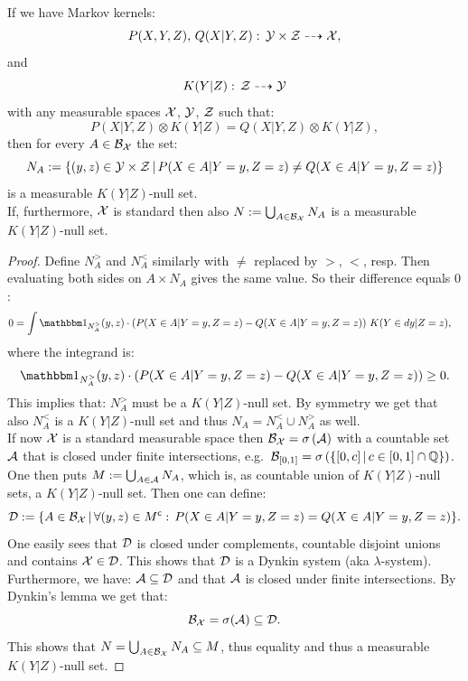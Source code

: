 \begin{Lem}
    \label{ess-unique}
    If we have Markov kernels:    
    \[P(X,Y,Z),\,Q(X|Y,Z):\, \mathcal{Y}\times \mathcal{Z} \dashrightarrow \mathcal{X},\]
    and 
    \[K(Y|Z):\,\mathcal{Z} \dashrightarrow \mathcal{Y}\]
    with any measurable spaces $\mathcal{X}$, $\mathcal{Y}$, $\mathcal{Z}$ such that:
    \[ P(X|Y,Z) \otimes K(Y|Z) = Q(X|Y,Z) \otimes K(Y|Z), \]
    then for every $A \in \mathcal{B}_{\mathcal{X}}$ the set:
    \[N_A := \left \{ (y,z) \in \mathcal{Y} \times \mathcal{Z} \,|\, P(X \in A|Y=y,Z=z) \neq Q(X \in A|Y=y,Z=z)\right \}\]
     is a measurable $K(Y|Z)$-null set. \\
     If, furthermore, $\mathcal{X}$ is standard then also $N := \bigcup_{A \in \mathcal{B}_{\mathcal{X}}} N_A$ is a measurable $K(Y|Z)$-null set.
     \begin{proof}
         Define $N_A^>$ and $N_A^<$ similarly with $\neq$ replaced by $>$, $<$, resp.
         Then evaluating both sides on $A \times N_A$ gives the same value. So their difference equals $0$:
         \begin{align*}
             0& =  \int \I_{N_A^>}(y,z)\cdot \lp P(X\in A|Y=y,Z=z) - Q(X \in A|Y=y,Z=z) \rp \, K(Y \in dy|Z=z), 
         \end{align*}
         where the integrand is:
         \[\I_{N_A^>}(y,z)\cdot \lp P(X\in A|Y=y,Z=z) - Q(X \in A|Y=y,Z=z) \rp  \ge 0.\]
         This implies that: $N_A^>$ must be a $K(Y|Z)$-null set.
         By symmetry we get that also $N_A^<$ is a $K(Y|Z)$-null set and thus $N_A = N_A^< \cup N_A^>$ as well.\\
         If now $\mathcal{X}$ is a standard measurable space then $\mathcal{B}_{\mathcal{X}} =\sigma\left ( \mathcal{A}\right )$ 
         with a countable set $\mathcal{A}$ that is closed under finite intersections, e.g.\ 
         $\mathcal{B}_{[0,1]}=\sigma\left (\left \{[0,c]\,|\, c \in [0,1] \cap \mathbb{Q}\right \}\right )$. 
         One then puts $M:=\bigcup_{A \in \mathcal{A}} N_A$, which is, as countable union of $K(Y|Z)$-null sets, a $K(Y|Z)$-null set.
         Then one can define:
         \[ \mathcal{D} := \{ A \in \mathcal{B}_{\mathcal{X}} \,|\, \forall (y,z) \in M^{\mathsf{c}}:\, P(X \in A|Y=y,Z=z)=Q(X \in A|Y=y,Z=z) \}.\]
         One easily sees that $\mathcal{D}$ is closed under complements, countable disjoint unions and contains $\mathcal{X} \in \mathcal{D}$.
         This shows that $\mathcal{D}$ is a Dynkin system (aka $\lambda$-system).
         Furthermore, we have: $\mathcal{A} \subseteq \mathcal{D}$ and that $\mathcal{A}$ is closed under finite intersections. 
         By Dynkin's lemma we get that:
         \[\mathcal{B}_{\mathcal{X}} = \sigma(\mathcal{A}) \subseteq \mathcal{D}.\]
         This shows that $N = \bigcup_{A \in \mathcal{B}_{\mathcal{X}}}N_A \subseteq M$, thus equality and thus a measurable $K(Y|Z)$-null set.
     \end{proof}
 \end{Lem}

